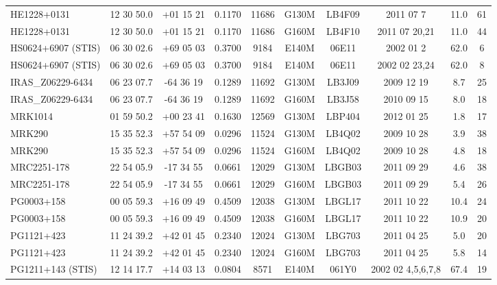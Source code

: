 \documentclass[iop]{emulateapj-rtx4}
\begin{document}
\begin{table}[ht]
\begin{center}
\begin{tabular}{l c c c c c c c c c}
 HE1228+0131 			        & 12 30 50.0  &  +01 15 21  &  0.1170 & 11686   & G130M     & LB4F09   & 2011 07 7      &  11.0 &  61  \\
 HE1228+0131 			        & 12 30 50.0  &  +01 15 21  &  0.1170 & 11686   & G160M     & LB4F10   & 2011 07 20,21 &  11.0 &  44  \\
 HS0624+6907 (STIS)               & 06 30 02.6  &  +69 05 03  &  0.3700 & 9184   & E140M      & 06E11      & 2002 01 2    &   62.0 &  6  \\
 HS0624+6907 (STIS)               & 06 30 02.6  &  +69 05 03  &  0.3700 & 9184	& E140M      & 06E11      & 2002 02 23,24  &   62.0 &  8  \\
 IRAS\_Z06229-6434 		& 06 23 07.7  &  -64 36 19   &  0.1289 & 11692	 & G130M     & LB3J09   & 2009 12 19   &     8.7 &  25  \\
 IRAS\_Z06229-6434 		& 06 23 07.7  &  -64 36 19   &  0.1289 & 11692	 & G160M     & LB3J58   & 2010 09 15   &     8.0 &  18  \\
 MRK1014 				& 01 59 50.2  &  +00 23 41  &  0.1630  & 12569 & G130M     & LBP404   & 2012 01 25  &    1.8 &  17  \\
 MRK290					& 15 35 52.3  &  +57 54 09  &  0.0296  & 11524 & G130M     & LB4Q02   & 2009 10 28  &   3.9 &  38  \\
 MRK290					& 15 35 52.3  &  +57 54 09  &  0.0296  & 11524 & G160M     & LB4Q02   & 2009 10 28  &   4.8 &  18  \\
 MRC2251-178 			& 22 54 05.9  &  -17 34 55   &  0.0661  & 12029 & G130M     & LBGB03   & 2011 09 29  &  4.6  &  38  \\
 MRC2251-178 			& 22 54 05.9  &  -17 34 55   &  0.0661  & 12029 & G160M     & LBGB03   & 2011 09 29  &  5.4  &  26  \\
 PG0003+158 				& 00 05 59.3  &  +16 09 49  &  0.4509 & 12038 & G130M      & LBGL17  & 2011 10 22  &   10.4 &  24  \\
 PG0003+158 				& 00 05 59.3  &  +16 09 49  &  0.4509 & 12038 & G160M      & LBGL17  & 2011 10 22  &   10.9 &  20  \\
 PG1121+423 				& 11 24 39.2  &  +42 01 45  &  0.2340 & 12024	 & G130M     & LBG703   & 2011 04 25   &     5.0 & 20  \\
 PG1121+423 				& 11 24 39.2  &  +42 01 45  &  0.2340 & 12024	 & G160M     & LBG703   & 2011 04 25   &     5.8 & 14  \\
 PG1211+143 (STIS)			& 12 14 17.7  &  +14 03 13  &  0.0804  &  8571  & E140M     & 061Y0      & 2002 02 4,5,6,7,8  & 67.4 &  19  \\

\end{tabular}
\end{center}
\end{table}
\end{document}
